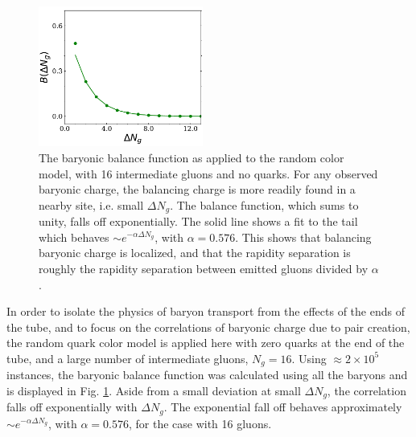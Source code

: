 \documentclass[aps, prc, 12pt, nofootinbib, showpacs, superscriptaddress, tightenlines, groupedaddress]{revtex4-2}
\begin{document}
\begin{figure}
\centerline{\includegraphics[width=0.48\textwidth]{figs/bcorr.pdf}}
\caption{\label{fig:bcorr}
The baryonic balance function as applied to the random color model, with 16 intermediate gluons and no quarks. For any observed baryonic charge, the balancing charge is more readily found in a nearby site, i.e. small $\Delta N_g$. The balance function, which sums to unity, falls off exponentially. The solid line shows a fit to the tail which behaves $\sim e^{-\alpha\Delta N_g}$, with $\alpha=0.576$. This shows that balancing baryonic charge is localized, and that the rapidity separation is roughly the rapidity separation between emitted gluons divided by $\alpha$.
}
\end{figure}
In order to isolate the physics of baryon transport from the effects of the ends of the tube, and to focus on the correlations of baryonic charge due to pair creation, the random quark color model is applied here with zero quarks at the end of the tube, and a large number of intermediate gluons, $N_g=16$. Using $\approx 2\times 10^5$ instances, the baryonic balance function was calculated using all the baryons and is displayed in Fig. \ref{fig:bcorr}. Aside from a small deviation at small $\Delta N_g$, the correlation falls off exponentially with $\Delta N_g$. The exponential fall off behaves approximately $\sim e^{-\alpha \Delta N_g}$, with $\alpha=0.576$, for the case with 16 gluons.
\end{document}
